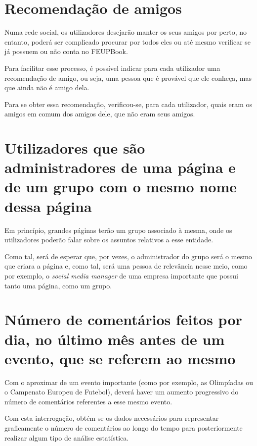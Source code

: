 \documentclass[12pt]{report}
\begin{document}
\section{Recomendação de amigos}

Numa rede social, os utilizadores desejarão manter os seus amigos por perto, no entanto, poderá ser complicado procurar por todos eles ou até mesmo verificar se já possuem ou não conta no FEUPBook. \par

Para facilitar esse processo, é possível indicar para cada utilizador uma recomendação de amigo, ou seja, uma pessoa que é provável que ele conheça, mas que ainda não é amigo dela. \par

Para se obter essa recomendação, verificou-se, para cada utilizador, quais eram os amigos em comum dos amigos dele, que não eram seus amigos.

\section{Utilizadores que são administradores de uma página e de um grupo com o mesmo nome dessa página}

Em princípio, grandes páginas terão um grupo associado à mesma, onde os utilizadores poderão falar sobre os assuntos relativos a esse entidade. \par

Como tal, será de esperar que, por vezes, o administrador do grupo será o mesmo que criara a página e, como tal, será uma pessoa de relevância nesse meio, como por exemplo, o \textit{social media manager} de uma empresa importante que possui tanto uma página, como um grupo.

\section{Número de comentários feitos por dia, no último mês antes de um evento, que se referem ao mesmo}

Com o aproximar de um evento importante (como por exemplo, as Olimpíadas ou o Campenato Europeu de Futebol), deverá haver um aumento progressivo do número de comentários referentes a esse mesmo evento. \par

Com esta interrogação, obtém-se os dados necessários para representar graficamente o número de comentários ao longo do tempo para posteriormente realizar algum tipo de análise estatística.
\end{document}
